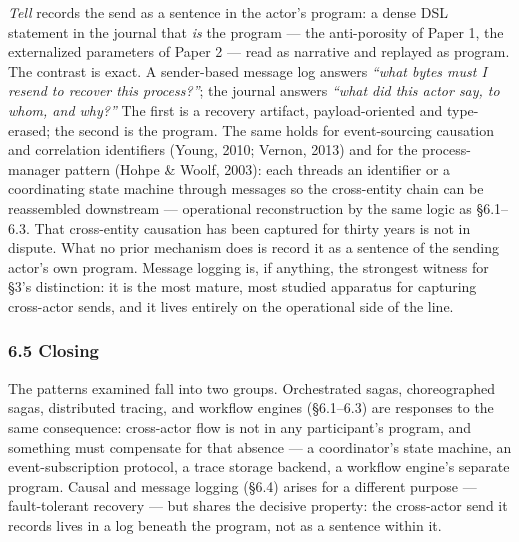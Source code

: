 \documentclass[
]{article}
\begin{document}
\emph{Tell} records the send as a sentence in the actor's program: a
dense DSL statement in the journal that \emph{is} the program --- the
anti-porosity of Paper 1, the externalized parameters of Paper 2 ---
read as narrative and replayed as program. The contrast is exact. A
sender-based message log answers \emph{``what bytes must I resend to
recover this process?''}; the journal answers \emph{``what did this
actor say, to whom, and why?''} The first is a recovery artifact,
payload-oriented and type-erased; the second is the program. The same
holds for event-sourcing causation and correlation identifiers (Young,
2010; Vernon, 2013) and for the process-manager pattern (Hohpe \& Woolf,
2003): each threads an identifier or a coordinating state machine
through messages so the cross-entity chain can be reassembled downstream
--- operational reconstruction by the same logic as §6.1--6.3. That
cross-entity causation has been captured for thirty years is not in
dispute. What no prior mechanism does is record it as a sentence of the
sending actor's own program. Message logging is, if anything, the
strongest witness for §3's distinction: it is the most mature, most
studied apparatus for capturing cross-actor sends, and it lives entirely
on the operational side of the line.

\subsubsection{6.5 Closing}\label{closing-2}

The patterns examined fall into two groups. Orchestrated sagas,
choreographed sagas, distributed tracing, and workflow engines
(§6.1--6.3) are responses to the same consequence: cross-actor flow is
not in any participant's program, and something must compensate for that
absence --- a coordinator's state machine, an event-subscription
protocol, a trace storage backend, a workflow engine's separate program.
Causal and message logging (§6.4) arises for a different purpose ---
fault-tolerant recovery --- but shares the decisive property: the
cross-actor send it records lives in a log beneath the program, not as a
sentence within it.
\end{document}
